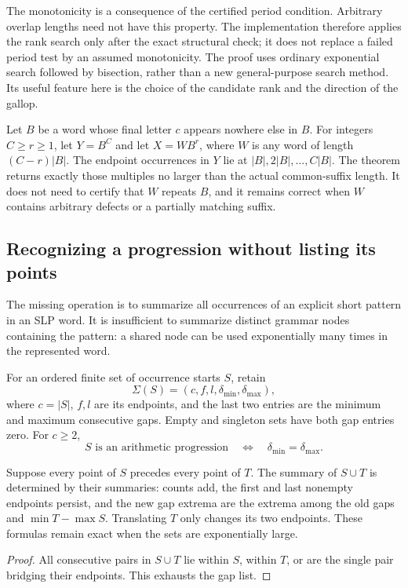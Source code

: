 The monotonicity is a consequence of the certified period condition.
Arbitrary overlap lengths need not have this property. The implementation
therefore applies the rank search only after the exact structural check;
it does not replace a failed period test by an assumed monotonicity.
The proof uses ordinary exponential search followed by bisection, rather
than a new general-purpose search method. Its useful feature here is the
choice of the candidate rank and the direction of the gallop.

\begin{example}
Let $B$ be a word whose final letter $c$ appears nowhere else in $B$.
For integers $C\geq r\geq1$, let $Y=B^C$ and let $X=WB^r$, where
$W$ is any word of length $(C-r)|B|$. The endpoint occurrences in
$Y$ lie at $|B|,2|B|,\ldots,C|B|$. The theorem returns exactly those
multiples no larger than the actual common-suffix length. It does not need
to certify that $W$ repeats $B$, and it remains correct when $W$ contains
arbitrary defects or a partially matching suffix.
\end{example}

\subsection{Recognizing a progression without listing its points}

The missing operation is to summarize all occurrences of an explicit short
pattern in an SLP word. It is insufficient to summarize distinct grammar
nodes containing the pattern: a shared node can be used exponentially many
times in the represented word.

For an ordered finite set of occurrence starts $S$, retain
\[
 \Sigma(S)=(c,f,l,\delta_{\min},\delta_{\max}),
\]
where $c=|S|$, $f,l$ are its endpoints, and the last two entries are the
minimum and maximum consecutive gaps. Empty and singleton sets have both
gap entries zero. For $c\geq2$,
\begin{equation}
 S\text{ is an arithmetic progression}
 \quad\Longleftrightarrow\quad
 \delta_{\min}=\delta_{\max}.\label{eq:ap-test}
\end{equation}

\begin{lemma}
\label{lem:summary}
Suppose every point of $S$ precedes every point of $T$. The summary of
$S\cup T$ is determined by their summaries: counts add, the first and last
nonempty endpoints persist, and the new gap extrema are the extrema among
the old gaps and $\min T-\max S$. Translating $T$ only changes its two
endpoints. These formulas remain exact when the sets are exponentially large.
\end{lemma}
\begin{proof}
All consecutive pairs in $S\cup T$ lie within $S$, within $T$, or are the
single pair bridging their endpoints. This exhausts the gap list.
\end{proof}

